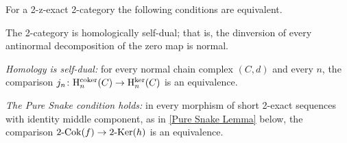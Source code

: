 \begin{proposition}
  \label{Criteria HSD}   \leanok
  For a 2-z-exact 2-category the following conditions are equivalent.
	\begin{tfae}
		\item The 2-category is homologically self-dual; that is, the dinversion of every antinormal decomposition of the zero map is normal.
		\item \emph{Homology is self-dual:} for every normal chain complex \((C,d)\) and every \(n\), the comparison \(j_n\colon\mathrm{H}^{\mathrm{coker}}_{n}(C)\to\mathrm{H}^{\ker}_{n}(C)\) is an equivalence.
		\item \emph{The Pure Snake condition holds:} in every morphism of short 2-exact sequences with identity middle component, as in \lemx\ref{Pure Snake Lemma} below, the comparison \(2\text{-}\mathrm{Cok}(f)\to2\text{-}\mathrm{Ker}(h)\) is an equivalence.
	\end{tfae}
\end{proposition}

